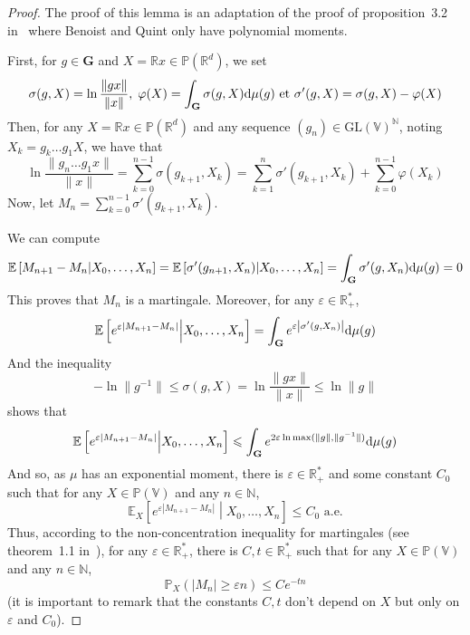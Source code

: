 \documentclass[11pt]{amsart}
\theoremstyle{definition}
\theoremstyle{remark}
\numberwithin{equation}{section}
\begin{document}
\begin{proof}
The proof of this lemma is an adaptation of the proof of proposition~3.2 in~\cite{BQlin} where Benoist and Quint only have polynomial moments.

First, for $g\in {\mathbf G}$ and $X={\mathbb R} x\in {\mathbb P}({\mathbb R}^d)$, we set
\[
\sigma(g,X) = \ln \frac{ \|gx\|}{\|x\|},\;\varphi(X) = \int_{\mathbf G} \sigma(g,X) {{\rm d}}\mu(g)  \text{ et }\sigma'(g,X) = \sigma(g,X) - \varphi(X)
\]
Then, for any $X={\mathbb R} x \in {\mathbb P}({\mathbb R}^d)$ and any sequence $(g_n) \in \mathrm{GL}({\mathbb V})^{\mathbb N}$, noting $X_k = g_k \dots g_1 X$, we have that
\[
\ln \frac{\|g_n \dots g_1 x\|}{\|x\|} = \sum_{k=0}^{n-1} \sigma(g_{k+1}, X_k) = \sum_{k=1}^n \sigma'(g_{k+1}, X_k) + \sum_{k=0}^{n-1} \varphi(X_k)
\]
Now, let $M_n = \sum_{k=0}^{n-1}\sigma'(g_{k+1},X_k)$.

We can compute
\[
{\mathbb E}\left[ M_{n+1} - M_n \middle| X_0, \dots,X_n \right] = {\mathbb E} \left[\sigma'(g_{n+1}, X_n) \middle| X_0, \dots ,X_n \right] = \int_{\mathbf G} \sigma'(g,X_n) {{\rm d}}\mu(g) = 0
\]
This proves that $M_n$ is a martingale.
Moreover, for any $\varepsilon \in {\mathbb R}_+^\ast$,
\[
{\mathbb E} \left[ e^{\varepsilon \left|M_{n+1} - M_n\right|} \middle| X_0, \dots, X_n \right] = \int_{\mathbf G} e^{\varepsilon \left|\sigma'(g,X_n)\right|} {{\rm d}}\mu(g) 
\]
And the inequality
\[
-\ln \|g^{-1} \| \leqslant \sigma(g,X) = \ln \frac{ \|gx\|}{\|x\|} \leqslant \ln \|g\|
\]
shows that
\[
{\mathbb E} \left[ e^{\varepsilon \left|M_{n+1} - M_n\right|} \middle| X_0, \dots, X_n \right] \leqslant \int_{\mathbf G} e^{2\varepsilon \ln \max(\|g\|, \|g^{-1}\|)} {{\rm d}}\mu(g)
\]
And so, as $\mu$ has an exponential moment, there is $\varepsilon \in {\mathbb R}_+^\ast$ and some constant $C_0$ such that for any $X\in {\mathbb P}({\mathbb V})$ and any $n\in {\mathbb N}$,
\[
{\mathbb E}_X \left[ e^{\varepsilon \left|M_{n+1} - M_n\right|} \middle| X_0, \dots, X_n \right] \leqslant C_0 \text{ a.e.}
\]
Thus, according to the non-concentration inequality for martingales (see theorem~1.1 in~\cite{LW09}), for any $\varepsilon \in {\mathbb R}_+^\ast$, there is $C,t\in {\mathbb R}_+^\ast$ such that for any $X\in {\mathbb P}({\mathbb V})$ and any $n\in {\mathbb N}$,
\[
{\mathbb P}_X( |M_n| \geqslant \varepsilon n)\leqslant Ce^{-tn}
\]
(it is important to remark that the constants $C,t$ don't depend on $X$ but only on $\varepsilon$ and $C_0$).


\end{proof}
\end{document}

